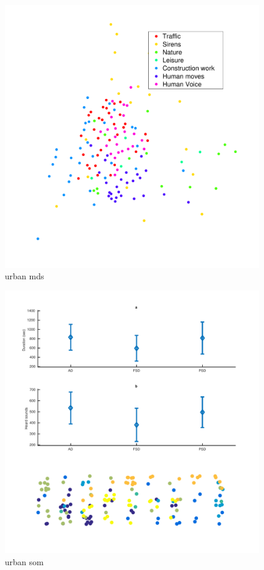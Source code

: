 \documentclass[12pt,a4paper,fleqn]{tufte-handout}
\begin{document}
\begin{figure}   
\begin{center}   
\includegraphics[scale=.5]{figures/urban_mds}   
\caption{urban mds}   
\end{center}   
\end{figure}   
 
\begin{figure}   
\begin{center}   
\includegraphics[scale=.5]{figures/urban_som}   
\caption{urban som}   
\end{center}   
\end{figure}   
 
\end{document}
